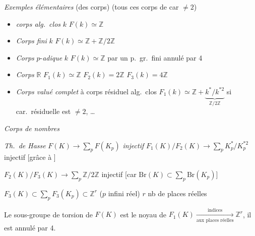\documentclass[11pt,a4paper]{article}
\begin{document}


\emph{Exemples élémentaires} (des corps) \quad (tous ces corps de car
$\neq 2$)

\begin{itemize}
  \item[a)] \emph{corps alg.\ clos} $k$ \quad $F(k) \simeq \mathbb{Z}$ \quad
  [On a $F_1(k) = 0$]
  \item[b)] \emph{Corps fini} $k$ \quad $F(k) \simeq \mathbb{Z} +
  \mathbb{Z}/2\mathbb{Z}$ \quad [On a $F_2(k) = 0$]
  \item[c)] \emph{Corps} $p$-\emph{adique} $k$ \quad $F(k) \simeq
  \mathbb{Z}$  par un p.\ gr.\ fini
  annulé par 4 \quad [On a $F_3(k) = 0$]
  \item[d)] \emph{Corps} $\mathbb{R}$ \quad $F_1(k) \simeq \mathbb{Z}$
    \quad $F_2(k) = 2\mathbb{Z}$ \quad $F_3(k) =
  4\mathbb{Z}$ \quad {}
  \item[e)] \emph{Corps valué complet} à corps résiduel alg.\ clos
  \struck{\ill{}} \quad $F_1(k) \simeq \mathbb{Z} + \underbrace{k^{*}/k^{*2}}_{\mathbb{Z}/2\mathbb{Z}}$
  si car.\ résiduelle est $\neq 2$,  \ill{} \ldots
  \quad [On a $F_2(k) = 0$]
\end{itemize}


\emph{Corps de nombres}

\emph{Th.\ de Hasse} \quad $F(K) \longrightarrow \sum_{p} F(K_p)$ \quad
\emph{injectif}
$F_1(K)/F_2(K) \longrightarrow \sum_p K_p^{*}/K_p^{*2}$ \quad
injectif [grâce à  \ill{}]

$F_2(K)/F_3(K) \longrightarrow \sum_p \mathbb{Z}/2\mathbb{Z}$ \quad
injectif [car $\mathrm{Br}(K) \subset \sum_p \mathrm{Br}(K_p)$]

$F_3(K) \subset \sum_{p} F_3(K_p) \subset \mathbb{Z}^r$ \quad ($p$ infini
réel) \quad $r$ nb de places réelles

Le sous-groupe de torsion de $F(K)$ est le noyau de
$F_1(K) \xrightarrow[\text{aux places réelles}]{\text{indices}}
\mathbb{Z}^r$, il est annulé par 4.
\end{document}
